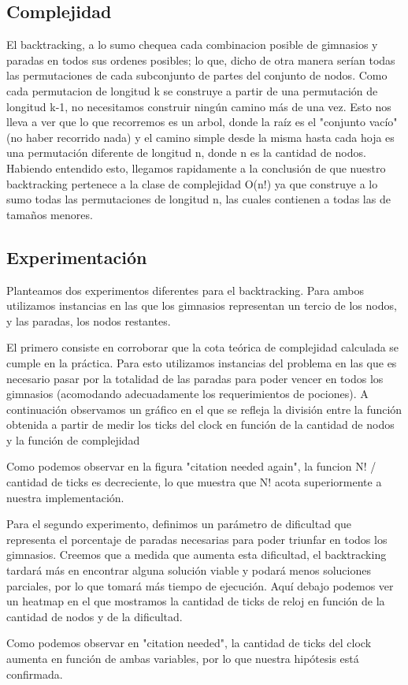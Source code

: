 \subsection{Complejidad}

El backtracking, a lo sumo chequea cada combinacion posible de gimnasios y paradas en todos sus ordenes posibles; lo que, dicho de otra manera serían todas las permutaciones de cada subconjunto de partes del conjunto de nodos. 
Como cada permutacion de longitud k se construye a partir de una permutación de longitud k-1, no necesitamos construir ningún camino más de una vez.
Esto nos lleva a ver que lo que recorremos es un arbol, donde la raíz es el "conjunto vacío" (no haber recorrido nada) y el camino simple desde la misma hasta cada hoja es una permutación diferente de longitud n, donde n es la cantidad de nodos.
Habiendo entendido esto, llegamos rapidamente a la conclusión de que nuestro backtracking pertenece a la clase de complejidad O(n!) ya que construye a lo sumo todas las permutaciones de longitud n, las cuales contienen a todas las de tamaños menores.


\subsection{Experimentaci\'on}

Planteamos dos experimentos diferentes para el backtracking. Para ambos utilizamos instancias en las que los gimnasios representan un tercio de los nodos, y las paradas, los nodos restantes.

El primero consiste en corroborar que la cota teórica de complejidad calculada se cumple en la práctica. Para esto utilizamos instancias del problema en las que es necesario pasar por la totalidad de las paradas para poder vencer en todos los gimnasios (acomodando adecuadamente los requerimientos de pociones). 
A continuación observamos un gráfico en el que se refleja la división entre la función obtenida a partir de medir los ticks del clock en función de la cantidad de nodos y la función de complejidad

Como podemos observar en la figura "citation needed again", la funcion N! / cantidad de ticks es decreciente, lo que muestra que N! acota superiormente a nuestra implementación.


Para el segundo experimento, definimos un parámetro de dificultad que representa el porcentaje de paradas necesarias para poder triunfar en todos los gimnasios. Creemos que a medida que aumenta esta dificultad, el backtracking tardará más en encontrar alguna solución viable y podará menos soluciones parciales, por lo que tomará más tiempo de ejecución.
Aquí debajo podemos ver un heatmap en el que mostramos la cantidad de ticks de reloj en función de la cantidad de nodos y de la dificultad.



Como podemos observar en "citation needed", la cantidad de ticks del clock aumenta en función de ambas variables, por lo que nuestra hipótesis está confirmada.